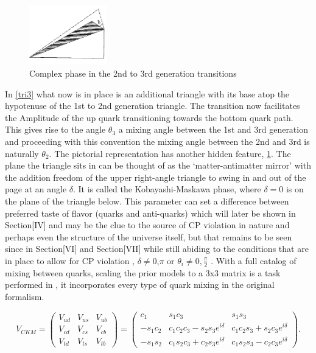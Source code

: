 \begin{figure}[h]
\includegraphics[angle=1.1,width=0.3\textwidth]{figs/ckmfig4b.jpg}
\caption{Complex phase in the 2nd to 3rd generation transitions}
\label{tri4}
\end{figure}

In \cref{tri3} what now is in place is an additional triangle with its base atop the hypotenuse of the 1st to 2nd generation triangle. The transition now facilitates the Amplitude of the up quark transitioning towards the bottom quark path. This gives rise to the angle $\theta_3$ a mixing angle between the 1st and 3rd generation and proceeding with this convention the mixing angle between the 2nd and 3rd is naturally $\theta_2$. The pictorial representation has another hidden feature, \cref{tri4}. The plane the triangle sits in can be thought of as the ‘matter-antimatter mirror’ with the addition freedom of the upper right-angle triangle to swing in and out of the page at an angle $\delta$. It is called the Kobayashi-Maskawa phase, where $\delta=0$ is on the plane of the triangle below. This parameter can set a difference between preferred taste of flavor (quarks and anti-quarks) which will later be shown in Section[IV] and may be the clue to the source of CP violation in nature and perhaps even the structure of the universe itself, but that remains to be seen since in Section[VI] and Section[VII] while still abiding to the conditions that are in place to allow for CP violation , $\delta\neq0$,$\pi$ or $\theta_i\neq0,\frac{\pi}{2}$  \cite{CKM4} .
With a full catalog of mixing between quarks, scaling the prior models to a 3x3 matrix is a task performed in \cite{CKM3} , it incorporates every type of quark mixing in the original formalism. 

\begin{equation}\label{ckm1}
V_{CKM} = \left( \begin{array}{ccc} V_{ud} & V_{us} & V_{ub} \\ V_{cd} & V_{cs} & V_{cb} \\ V_{td} & V_{ts} & V_{tb} \end{array}\right) = \left( \begin{array}{ccc} c_1 & s_1 c_3 & s_1 s_3 \\ -s_1 c_2 & c_1 c_2 c_3 -s_2 s_3 e^{i\delta} & c_1 c_2 s_3 + s_2 c_3 e^{i\delta} \\ -s_1 s_2 & c_1 s_2 c_3 +c_2 s_3 e^{i\delta} & c_1 s_2 s_3 - c_2 c_3 e^{i\delta} \end{array} \right). 
\end{equation}


